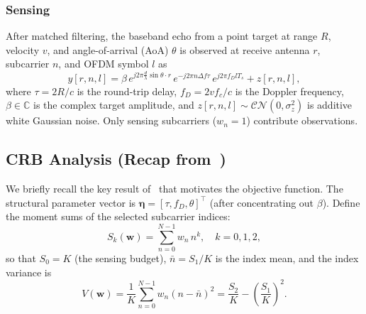 \subsubsection{Sensing}
After matched filtering, the baseband echo from a point target at range $R$, velocity $v$, and angle-of-arrival (AoA) $\theta$ is observed at receive antenna $r$, subcarrier $n$, and OFDM symbol $l$ as~\cite{sturm2011}
\begin{equation}
  y[r,n,l] = \beta \, e^{j2\pi \frac{d}{\lambda}\sin\theta \cdot r}
              \, e^{-j2\pi n \Delta f \tau}
              \, e^{j2\pi f_D l T_s}
              + z[r,n,l],
  \label{eq:echo}
\end{equation}
where $\tau = 2R/c$ is the round-trip delay, $f_D = 2v f_c / c$ is the Doppler frequency, $\beta \in \mathbb{C}$ is the complex target amplitude, and $z[r,n,l] \sim \mathcal{CN}(0, \sigma_z^2)$ is additive white Gaussian noise.
Only sensing subcarriers ($w_n = 1$) contribute observations.

\subsection{CRB Analysis (Recap from~\cite{ldsa})}
\label{subsec:crb_recap}

We briefly recall the key result of~\cite{ldsa} that motivates the objective function.
The structural parameter vector is $\boldsymbol{\eta} = [\tau, f_D, \theta]^\top$ (after concentrating out $\beta$).
Define the moment sums of the selected subcarrier indices:
\begin{equation}
  S_k(\mathbf{w}) = \sum_{n=0}^{N-1} w_n \, n^k, \quad k = 0, 1, 2,
  \label{eq:moments}
\end{equation}
so that $S_0 = K$ (the sensing budget), $\bar{n} = S_1 / K$ is the index mean, and the index variance is
\begin{equation}
  V(\mathbf{w}) = \frac{1}{K} \sum_{n=0}^{N-1} w_n (n - \bar{n})^2
               = \frac{S_2}{K} - \left(\frac{S_1}{K}\right)^{\!2}.
  \label{eq:variance}
\end{equation}

